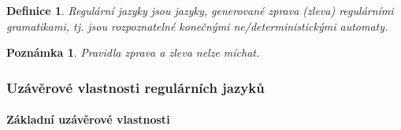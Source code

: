\documentclass[10pt,a4paper]{article}
\theoremstyle{note}
\newtheorem{definice}{Definice}
\newtheorem{poznamka}{Poznámka}
\begin{document}
\begin{definice}
Regulární jazyky jsou jazyky, generované zprava (zleva) regulárními gramatikami, tj. jsou rozpoznatelné konečnými ne/deterministickými automaty.
\end{definice}

\begin{poznamka}
Pravidla zprava a zleva nelze míchat.
\end{poznamka}





\subsubsection{Uzávěrové vlastnosti regulárních jazyků}

\paragraph{Základní uzávěrové vlastnosti}
\end{document}
